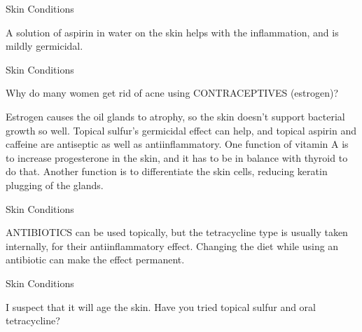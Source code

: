 \documentclass[11pt,oneside,openany,extrafontsizes]{memoir}
\begin{document}
\begin{standalonequote}{Skin Conditions}

    \begin{answer}
        A solution of aspirin in water on the skin helps with the inflammation, and is mildly germicidal.
    \end{answer}
\end{standalonequote}

\begin{qaexchange}{Skin Conditions}

    \begin{question}
        Why do many women get rid of acne using CONTRACEPTIVES (estrogen)?
    \end{question}

    \begin{answer}
        Estrogen causes the oil glands to atrophy, so the skin doesn't support bacterial growth so well. Topical sulfur's germicidal effect can help, and topical aspirin and caffeine are antiseptic as well as antiinflammatory. One function of vitamin A is to increase progesterone in the skin, and it has to be in balance with thyroid to do that. Another function is to differentiate the skin cells, reducing keratin plugging of the glands.
    \end{answer}
\end{qaexchange}

\begin{standalonequote}{Skin Conditions}

    \begin{answer}
        ANTIBIOTICS can be used topically, but the tetracycline type is usually taken internally, for their antiinflammatory effect. Changing the diet while using an antibiotic can make the effect permanent.
    \end{answer}
\end{standalonequote}

\begin{standalonequote}{Skin Conditions}

    \begin{answer}
        I suspect that it will age the skin. Have you tried topical sulfur and oral tetracycline?
    \end{answer}
\end{standalonequote}
\end{document}
